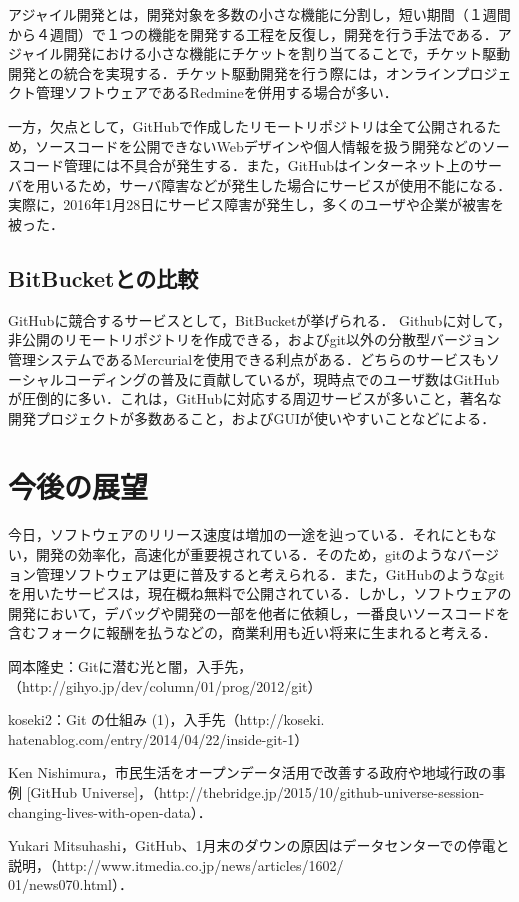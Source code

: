 \documentclass[a4j,9pt,twocolumn]{jsarticle}
\begin{document}
アジャイル開発とは，開発対象を多数の小さな機能に分割し，短い期間（１週間から４週間）で１つの機能を開発する工程を反復し，開発を行う手法である．アジャイル開発における小さな機能にチケットを割り当てることで，チケット駆動開発との統合を実現する．チケット駆動開発を行う際には，オンラインプロジェクト管理ソフトウェアであるRedmineを併用する場合が多い．

一方，欠点として，GitHubで作成したリモートリポジトリは全て公開されるため，ソースコードを公開できないWebデザインや個人情報を扱う開発などのソースコード管理には不具合が発生する．また，GitHubはインターネット上のサーバを用いるため，サーバ障害などが発生した場合にサービスが使用不能になる．実際に，2016年1月28日にサービス障害が発生し，多くのユーザや企業が被害を被った\cite{news}．

\subsection{BitBucketとの比較}
GitHubに競合するサービスとして，BitBucketが挙げられる． Githubに対して，非公開のリモートリポジトリを作成できる，およびgit以外の分散型バージョン管理システムであるMercurialを使用できる利点がある．どちらのサービスもソーシャルコーディングの普及に貢献しているが，現時点でのユーザ数はGitHubが圧倒的に多い．これは，GitHubに対応する周辺サービスが多いこと，著名な開発プロジェクトが多数あること，およびGUIが使いやすいことなどによる．

\section{今後の展望}
今日，ソフトウェアのリリース速度は増加の一途を辿っている．それにともない，開発の効率化，高速化が重要視されている．そのため，gitのようなバージョン管理ソフトウェアは更に普及すると考えられる．また，GitHubのようなgitを用いたサービスは，現在概ね無料で公開されている．しかし，ソフトウェアの開発において，デバッグや開発の一部を他者に依頼し，一番良いソースコードを含むフォークに報酬を払うなどの，商業利用も近い将来に生まれると考える．

\small
\begin{thebibliography}{99}
岡本隆史：Gitに潜む光と闇，入手先，（http://gihyo.jp/dev/column/01/prog/2012/git）

koseki2：Git の仕組み (1)，入手先（http://koseki.\\hatenablog.com/entry/2014/04/22/inside-git-1）

Ken Nishimura，市民生活をオープンデータ活用で改善する政府や地域行政の事例 [GitHub Universe]，（http://thebridge.jp/2015/10/github-universe-session-changing-lives-with-open-data）．

Yukari Mitsuhashi，GitHub、1月末のダウンの原因はデータセンターでの停電と説明，（http://www.itmedia.co.jp/news/articles/1602/\\01/news070.html）．
\end{thebibliography}
\end{document}
